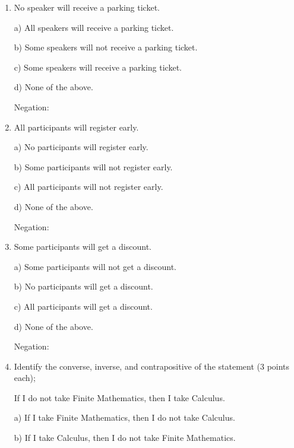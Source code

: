 \documentclass[12pt]{article}
\newcommand{\tab}{\hspace*{2em}}
\begin{document}
\begin{enumerate}
\tab b) You are a Business major and you do not take Math 107.

\tab c) If you are not a Business major, then you do not take Math 107.

\tab d) If you are a Business major, then you do not take Math 107.

Negation: \underline{\hspace{1.0 in}}

\item No speaker will receive a parking ticket.

\tab a) All speakers will receive a parking ticket.

\tab b) Some speakers will not receive a parking ticket.

\tab c) Some speakers will receive a parking ticket.

\tab d) None of the above.

Negation: \underline{\hspace{1.0 in}}

\item All participants will register early.

\tab a) No participants will register early.

\tab b) Some participants will not register early.

\tab c) All participants will not register early.

\tab d) None of the above.

Negation: \underline{\hspace{1.0 in}}

\item Some participants will get a discount.

\tab a) Some participants will not get a discount.

\tab b) No participants will get a discount.

\tab c) All participants will get a discount.

\tab d) None of the above.

Negation: \underline{\hspace{1.0 in}}

\item Identify the converse, inverse, and contrapositive of the statement (3 points each);

If I do not take Finite Mathematics, then I take Calculus.

\tab a) If I take Finite Mathematics, then I do not take Calculus.

\tab b) If I take Calculus, then I do not take Finite Mathematics.


\end{enumerate}
\end{document}
